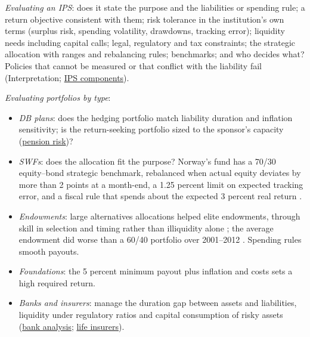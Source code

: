 \begin{qfmethod}\label{meth:institutional-ips-portfolios}
 \emph{Evaluating an IPS}: does it state the purpose and the liabilities or spending rule; a return objective consistent with them; risk tolerance in the institution's own terms (surplus risk, spending volatility, drawdowns, tracking error); liquidity needs including capital calls; legal, regulatory and tax constraints; the strategic allocation with ranges and rebalancing rules; benchmarks; and who decides what? Policies that cannot be measured or that conflict with the liability fail (Interpretation; \hyperref[meth:investment-policy-statement]{IPS components}).

\emph{Evaluating portfolios by type}:
\begin{itemize}
\item \emph{DB plans}: does the hedging portfolio match liability duration and inflation sensitivity; is the return-seeking portfolio sized to the sponsor's capacity (\hyperref[meth:db-pension-risk]{pension risk})?
\item \emph{SWFs}: does the allocation fit the purpose? Norway's fund has a 70/30 equity--bond strategic benchmark, rebalanced when actual equity deviates by more than 2 points at a month-end, a 1.25 percent limit on expected tracking error, and a fiscal rule that spends about the expected 3 percent real return \citep[benchmark index; risk management; about the fund]{nbim-gpfg-2026}.
\item \emph{Endowments}: large alternatives allocations helped elite endowments, through skill in selection and timing rather than illiquidity alone \citep[NBER WP 14341, abstract, pp.~1--2]{lerner-schoar-wang-endowments-2008}; the average endowment did worse than a 60/40 portfolio over 2001--2012 \citep[pp.~26--27]{s7-ang}. Spending rules smooth payouts.
\item \emph{Foundations}: the 5 percent minimum payout plus inflation and costs sets a high required return.
\item \emph{Banks and insurers}: manage the duration gap between assets and liabilities, liquidity under regulatory ratios and capital consumption of risky assets (\hyperref[meth:bank-camels-analysis]{bank analysis}; \hyperref[meth:life-insurer-analysis]{life insurers}).
\end{itemize}


\end{qfmethod}
